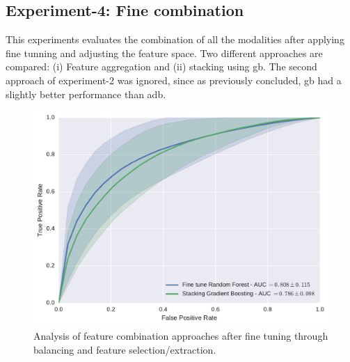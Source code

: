 \subsection{Experiment-4: Fine combination}\label{subsec:chp6:exp-res:Ex4}
This experiments evaluates the combination of all the modalities after applying fine tunning and adjusting the feature space. 
Two different approaches are compared: (i) Feature aggregation and (ii) stacking using \ac{gb}. 
The second approach of experiment-2 was ignored, since as previously concluded, \ac{gb} had a slightly better performance than \ac{adb}.

\begin{figure}
  \centering
  \includegraphics[width=0.7\linewidth]{6_pipeline/figures/exp-5/combine_all.pdf}
  \caption[Analysis of feature combination approaches after fine tuning.]{Analysis of feature combination approaches after fine tuning through balancing and feature selection/extraction.}
  \label{fig:res-Ex4}
\end{figure}


